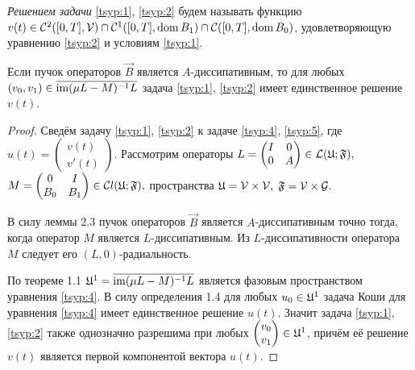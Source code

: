 \smallskip


\begin{definition}[4.1]\emph{Решением задачи} \eqref{tsyp:1}, \eqref{tsyp:2} будем называть функцию $v(t)\in {\mathcal C}^2([0,T],{\mathcal V})\cap{\mathcal C}^1([0,T], \mathop{\rm dom}B_1)\cap{\mathcal C}([0,T], \mathop{\rm dom}B_0) $,
удовлетворяющую уравнению \eqref{tsyp:2} и условиям \eqref{tsyp:1}.
\end{definition}

\smallskip

\begin{theorem}[4.1]Если пучок операторов $\vec{B}$ является $A$-диссипативным{\rm ,} то для любых $(v_{0},v_{1})\in \overline{\mathop{\rm im}(\mu L-M)^{-1}L}$ задача \eqref{tsyp:1}{\rm ,} \eqref{tsyp:2} имеет единственное решение  $v(t)${\rm .}
\end{theorem}

\smallskip

\begin{proof}
Сведём задачу \eqref{tsyp:1}, \eqref{tsyp:2} к задаче \eqref{tsyp:4}, \eqref{tsyp:5}, где
$u(t)=\begin{pmatrix} v(t)\\v'(t)\end{pmatrix}.$
Рассмотрим операторы $L=\begin{pmatrix}
I&0\\0&A\end{pmatrix}\in\mathcal L (\frak U;\frak F),$
$M=\begin{pmatrix} 0&I\\B_{0}&B_{1}\end{pmatrix}\in\mathcal Cl
(\frak U;\frak F),$ пространства $\frak U=\mathcal V\times
\mathcal V,$ $\frak F=\mathcal V\times \mathcal G.$

В силу леммы 2.3 пучок операторов $\vec{B}$ является $A$-диссипативным
точно тогда, когда оператор $M$ является $L$-диссипативным. Из
$L$-диссипативности оператора $M$ следует его
$(L, 0)$-радиальность.

По теореме 1.1  $\frak U^{1}= \overline{\mathop{\rm im}(\mu L-M)^{-1}L}$ является фазовым пространством уравнения \eqref{tsyp:4}. В силу определения 1.4 для
любых $u_{0}\in\frak U^{1}$ задача Коши для уравнения \eqref{tsyp:4} имеет
единственное решение $u(t)$. 
Значит задача \eqref{tsyp:1}, \eqref{tsyp:2} также однозначно разрешима при любых $\begin{pmatrix} v_{0}\\v_{1}\end{pmatrix}\in\frak U^{1}$, причём её решение $v(t)$ является первой компонентой вектора $u(t)$.\end{proof}

